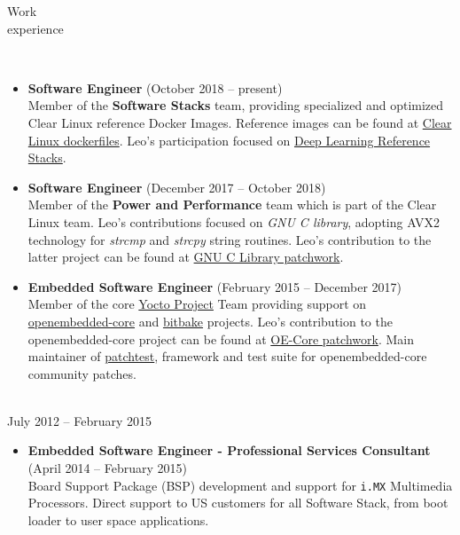 \documentclass{resume}
\begin{document}
\begin{category}{Work \\experience}

\\

\begin{itemize}
\item \textbf{Software Engineer} (October 2018 -- present)\\
  Member of the \textbf{Software Stacks} team, providing specialized and optimized
  Clear Linux reference Docker Images. Reference images can be found at
  \href{https://github.com/clearlinux/dockerfiles}{Clear Linux
    dockerfiles}. Leo's participation focused on
  \href{https://github.com/clearlinux/dockerfiles/tree/master/stacks/dlrs}{Deep 
   Learning Reference Stacks}.
\end{itemize}


\begin{itemize}
\item \textbf{Software Engineer} (December 2017 -- October 2018)\\
  Member of the \textbf{Power and Performance} team which is part of the Clear
  Linux team. Leo's contributions focused on \textit{GNU
    C library}, adopting AVX2 technology for \textit{strcmp} and
  \textit{strcpy} string routines. Leo's contribution to the latter project can be found at
  \href{https://patchwork.ozlabs.org/project/glibc/list/?submitter=74072}{GNU
    C Library patchwork}.
\end{itemize}

\begin{itemize}
\item \textbf{Embedded Software Engineer} (February 2015 -- December 2017)\\
  Member of the core \href{https://www.yoctoproject.org/}{Yocto Project} Team
  providing support on \href{http://cgit.openembedded.org/openembedded-core/}{openembedded-core}
  and \href{http://cgit.openembedded.org/bitbake/}{bitbake} projects. Leo's contribution to 
  the openembedded-core project can be found at
  \href{https://patchwork.openembedded.org/project/oe-core/series/?ordering=-last_updated}{OE-Core patchwork}. Main maintainer of
  \href{http://git.yoctoproject.org/cgit/cgit.cgi/patchtest/}{patchtest}, framework and test suite for openembedded-core 
  community patches.
\end{itemize}

\\
July 2012 -- February 2015
\begin{itemize}
\item \textbf{Embedded Software Engineer - Professional Services Consultant} (April 2014 -- February 2015)\\
  Board Support Package (BSP) development and support for \texttt{i.MX}
  Multimedia Processors. Direct support to US customers for all Software
  Stack, from boot loader to user space applications.
\end{itemize}


\end{category}
\end{document}
